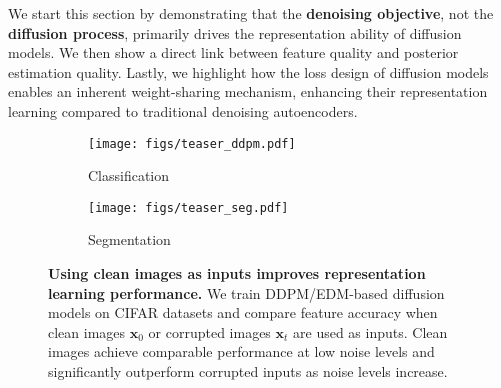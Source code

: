 {\color{blue}
We start this section by demonstrating that the \textbf{denoising objective}, not the \textbf{diffusion process}, primarily drives the representation ability of diffusion models. We then show a direct link between feature quality and posterior estimation quality. Lastly, we highlight how the loss design of diffusion models enables an inherent weight-sharing mechanism, enhancing their representation learning compared to traditional denoising autoencoders.

\begin{figure}[t]
    \begin{center}
    \begin{subfigure}{0.48\textwidth}
    \texttt{[image: figs/teaser\_ddpm.pdf]}
    \caption{Classification} 
    \end{subfigure} \quad %
    \begin{subfigure}{0.48\textwidth}
    \texttt{[image: figs/teaser\_seg.pdf]}
    \caption{Segmentation} 
    \end{subfigure}
    \end{center}
    \vspace{-0.1in}
\caption{\textbf{Using clean images as inputs improves representation learning performance.} We train DDPM/EDM-based diffusion models on CIFAR datasets and compare feature accuracy when clean images $\bm x_0$ or corrupted images $\bm x_t$ are used as inputs. Clean images achieve comparable performance at low noise levels and significantly outperform corrupted inputs as noise levels increase.}
\label{fig:clean_feature}
\end{figure}

}
